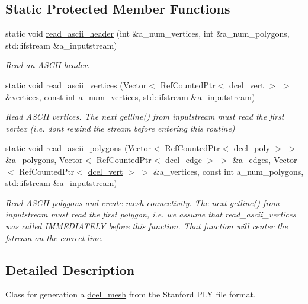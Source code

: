 \subsection*{Static Protected Member Functions}
\begin{DoxyCompactItemize}
\item 
static void \hyperlink{classply__reader_a4df2c2596716dd223730166c56eb7187}{read\+\_\+ascii\+\_\+header} (int \&a\+\_\+num\+\_\+vertices, int \&a\+\_\+num\+\_\+polygons, std\+::ifstream \&a\+\_\+inputstream)
\begin{DoxyCompactList}\small\item\em Read an A\+S\+C\+II header. \end{DoxyCompactList}\item 
static void \hyperlink{classply__reader_af69d8ccc7ce2f31a26eb68efc20b9824}{read\+\_\+ascii\+\_\+vertices} (Vector$<$ Ref\+Counted\+Ptr$<$ \hyperlink{classdcel__vert}{dcel\+\_\+vert} $>$ $>$ \&vertices, const int a\+\_\+num\+\_\+vertices, std\+::ifstream \&a\+\_\+inputstream)
\begin{DoxyCompactList}\small\item\em Read A\+S\+C\+II vertices. The next getline() from inputstream must read the first vertex (i.\+e. don\textquotesingle{}t rewind the stream before entering this routine) \end{DoxyCompactList}\item 
static void \hyperlink{classply__reader_acdc4d3c6133daa172fb7752d49ced5b4}{read\+\_\+ascii\+\_\+polygons} (Vector$<$ Ref\+Counted\+Ptr$<$ \hyperlink{classdcel__poly}{dcel\+\_\+poly} $>$ $>$ \&a\+\_\+polygons, Vector$<$ Ref\+Counted\+Ptr$<$ \hyperlink{classdcel__edge}{dcel\+\_\+edge} $>$ $>$ \&a\+\_\+edges, Vector$<$ Ref\+Counted\+Ptr$<$ \hyperlink{classdcel__vert}{dcel\+\_\+vert} $>$ $>$ \&a\+\_\+vertices, const int a\+\_\+num\+\_\+polygons, std\+::ifstream \&a\+\_\+inputstream)
\begin{DoxyCompactList}\small\item\em Read A\+S\+C\+II polygons and create mesh connectivity. The next getline() from inputstream must read the first polygon, i.\+e. we assume that read\+\_\+ascii\+\_\+vertices was called I\+M\+M\+E\+D\+I\+A\+T\+E\+LY before this function. That function will center the fstream on the correct line. \end{DoxyCompactList}\end{DoxyCompactItemize}


\subsection{Detailed Description}
Class for generation a \hyperlink{classdcel__mesh}{dcel\+\_\+mesh} from the Stanford P\+LY file format. 

